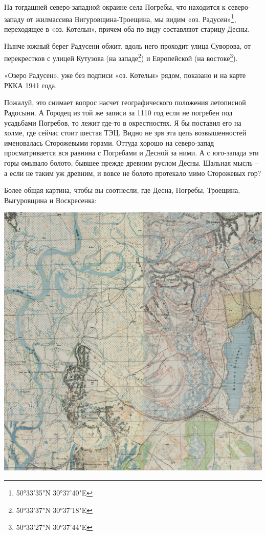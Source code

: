 На тогдашней северо-западной окраине села Погребы, что находится к северо-западу от жилмассива Вигуро\-вщина-Троещина, мы видим «оз. Радусен»\footnote{50°33'35"N 
30°37'40"E}, переходящее в «оз. Котельн», причем оба по виду составляют старицу Десны.

Нынче южный берег Радусени обжит, вдоль него проходит улица Суворова, от перекрестков с улицей Кутузова (на западе\footnote{50°33'37"N  30°37'18"E}) и Европейской (на востоке\footnote{50°33'27"N 30°37'44"E}).

«Озеро Радусен», уже без подписи «оз. Котельн» рядом, показано и на карте РККА 1941 года.

Пожалуй, это снимает вопрос насчет географического положения летописной Радосыни. А Городец из той же записи за 1110 год если не погребен под усадьбами Погребов, то лежит где-то в окрестностях. Я бы поставил его на холме, где сейчас стоит шестая ТЭЦ. Видно не зря эта цепь возвышенностей именовалась Сторожевыми горами. Оттуда хорошо на северо-запад просматривается вся равнина с Погребами и Десной за ними. А с юго-запада эти горы омывало болото, бывшее прежде древним руслом Десны. Шальная мысль – а если не таким уж древним, и вовсе не болото протекало мимо Сторожевых гор?

Более общая картина, чтобы вы соотнесли, где Десна, Погребы, Троещина, Выгуровщина и Воскресенка:

\begin{center}
\includegraphics[width=\linewidth]{chast-gorodki/radosyn/radosen-s.jpg}
\end{center}

